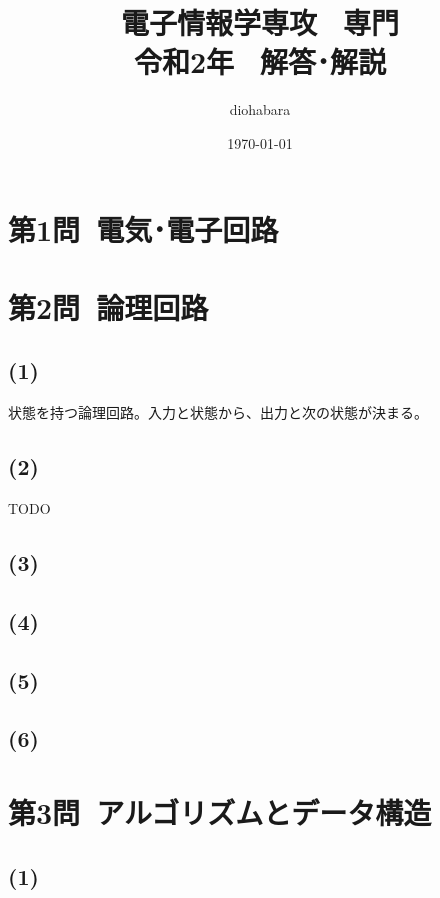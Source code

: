 \documentclass[a4paper,12pt,xelatex,ja=standard]{bxjsarticle}
\title{電子情報学専攻 \, 専門 \\ 令和2年 \, 解答･解説}
\author{diohabara}
\date{\today}
\begin{document}
\maketitle

\section*{第1問\ 電気･電子回路}

\section*{第2問\ 論理回路}
\subsection*{(1)}
状態を持つ論理回路。入力と状態から、出力と次の状態が決まる。

\subsection*{(2)}
TODO


\subsection*{(3)}
\subsection*{(4)}
\subsection*{(5)}
\subsection*{(6)}

\section*{第3問\ アルゴリズムとデータ構造}
\subsection*{(1)}
\end{document}
